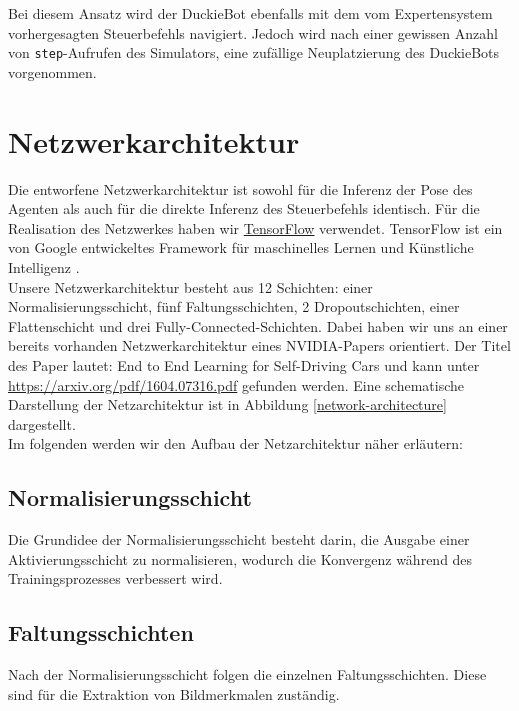 Bei diesem Ansatz wird der DuckieBot ebenfalls mit dem vom Expertensystem vorhergesagten Steuerbefehls navigiert. Jedoch wird nach einer gewissen Anzahl von \texttt{step}-Aufrufen des Simulators, eine zufällige Neuplatzierung des DuckieBots vorgenommen.


\section{Netzwerkarchitektur}

Die entworfene Netzwerkarchitektur ist sowohl für die Inferenz der Pose des Agenten als auch für die direkte Inferenz des Steuerbefehls identisch.
Für die Realisation des Netzwerkes haben wir \href{https://www.tensorflow.org/}{TensorFlow} verwendet. TensorFlow ist ein von Google entwickeltes Framework für maschinelles Lernen und Künstliche Intelligenz \cite{bigdata}. \\

Unsere Netzwerkarchitektur besteht aus 12 Schichten: einer Normalisierungsschicht, fünf Faltungsschichten, 2 Dropoutschichten, einer Flattenschicht und drei Fully-Connected-Schichten.
Dabei haben wir uns an einer bereits vorhanden Netzwerkarchitektur eines NVIDIA-Papers orientiert. Der Titel des Paper lautet: \glqq End to End Learning for Self-Driving Cars\grqq{} und kann unter \href{https://arxiv.org/pdf/1604.07316.pdf}{https://arxiv.org/pdf/1604.07316.pdf} gefunden werden.
Eine schematische Darstellung der Netzarchitektur ist in Abbildung \ref{network-architecture} dargestellt. \\

Im folgenden werden wir den Aufbau der Netzarchitektur näher erläutern:

\subsection{Normalisierungsschicht}
Die Grundidee der Normalisierungsschicht besteht darin, die Ausgabe einer Aktivierungsschicht zu normalisieren, wodurch die Konvergenz während des Trainingsprozesses verbessert wird. \cite{tensorflow}

\subsection{Faltungsschichten}
Nach der Normalisierungsschicht folgen die einzelnen Faltungsschichten. Diese sind für die Extraktion von Bildmerkmalen zuständig. \\

